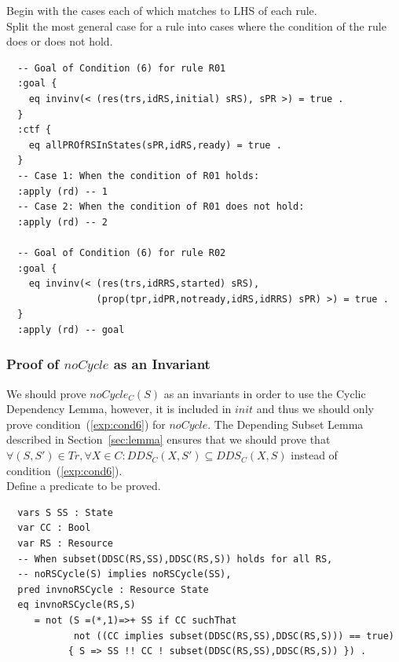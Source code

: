 \documentclass[12pt]{report}
\begin{document}
\vspace{0.3cm}
 Begin with the cases each of which matches to
LHS of each rule. \\ 
 Split the most general case for a rule into
cases where the condition of the rule does or does not hold. 
\begin{verbatim}
  -- Goal of Condition (6) for rule R01
  :goal {
    eq invinv(< (res(trs,idRS,initial) sRS), sPR >) = true .
  }
  :ctf {
    eq allPROfRSInStates(sPR,idRS,ready) = true .
  }
  -- Case 1: When the condition of R01 holds:
  :apply (rd) -- 1
  -- Case 2: When the condition of R01 does not hold:
  :apply (rd) -- 2

  -- Goal of Condition (6) for rule R02
  :goal {
    eq invinv(< (res(trs,idRRS,started) sRS),
                (prop(tpr,idPR,notready,idRS,idRRS) sPR) >) = true .
  }
  :apply (rd) -- goal
\end{verbatim}

\subsubsection*{Proof of $noCycle$ as an Invariant}
We should prove $noCycle_C(S)$ as an invariants in order to use the
Cyclic Dependency Lemma, however, it is included in $init$ and thus we
should only prove condition~(\ref{exp:cond6}) for $noCycle$.  The
Depending Subset Lemma described in Section~\ref{sec:lemma} ensures
that we should prove that $\forall (S,S') \in Tr, \forall X\in
C:DDS_C(X,S')\subseteq DDS_C(X,S)$ instead of
condition~(\ref{exp:cond6}).\\

 Define a predicate to be proved. 
\begin{verbatim}
  vars S SS : State
  var CC : Bool
  var RS : Resource
  -- When subset(DDSC(RS,SS),DDSC(RS,S)) holds for all RS,
  -- noRSCycle(S) implies noRSCycle(SS),
  pred invnoRSCycle : Resource State
  eq invnoRSCycle(RS,S) 
     = not (S =(*,1)=>+ SS if CC suchThat
            not ((CC implies subset(DDSC(RS,SS),DDSC(RS,S))) == true)
     	   { S => SS !! CC ! subset(DDSC(RS,SS),DDSC(RS,S)) }) .
\end{verbatim}
\end{document}
